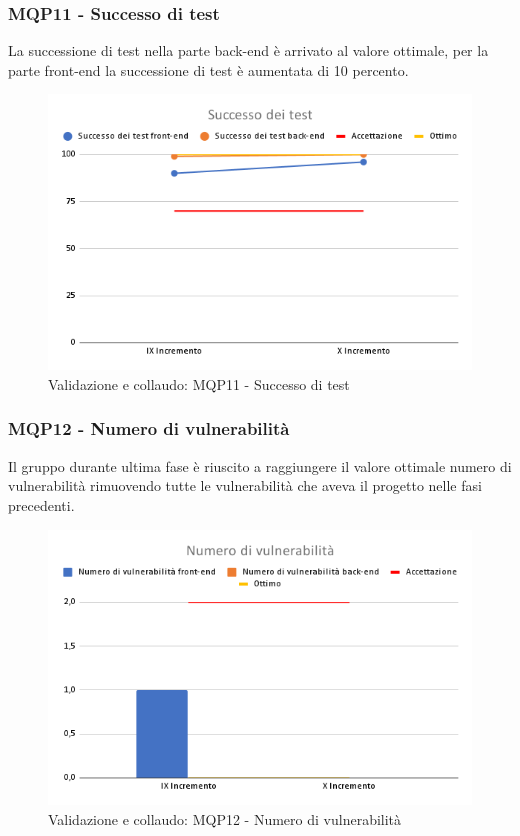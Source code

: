 \subsubsection{MQP11 - Successo di test}
La successione di test nella parte back-end è arrivato al valore ottimale, per la parte front-end la successione di test è aumentata di 10 percento.
\begin{figure}[H]
    \centering
    \includegraphics[scale=0.50]{Sezioni/images/last_prodotto/Successo_dei_test.png}
    \caption{Validazione e collaudo: MQP11 - Successo di test}
\end{figure}
\subsubsection{MQP12 - Numero di vulnerabilità}
Il gruppo durante ultima fase è riuscito a raggiungere il valore ottimale numero di vulnerabilità rimuovendo tutte le vulnerabilità che aveva il progetto nelle fasi precedenti.
\begin{figure}[H]
    \centering
    \includegraphics[scale=0.50]{Sezioni/images/last_prodotto/Numero_di_vulnerabilita.png}
    \caption{Validazione e collaudo: MQP12 - Numero di vulnerabilità}
\end{figure}

